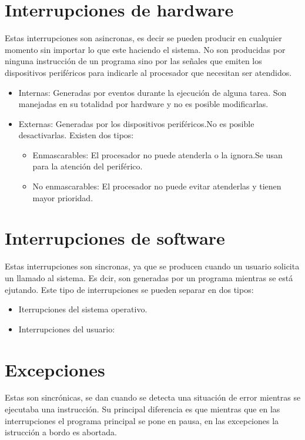\documentclass{report}   %
\begin{document}
\section*{Interrupciones de hardware}
Estas interrupciones son asincronas, es decir se pueden producir en cualquier momento sin importar lo que este haciendo el sistema. No son producidas por ninguna instrucción de un programa sino por las señales que emiten los dispositivos periféricos para indicarle al procesador que necesitan ser atendidos.

\begin{itemize}
    \item Internas: Generadas por eventos durante la ejecución de alguna tarea. Son manejadas en su totalidad por hardware y no es posible modificarlas.
    \item Externas: Generadas por los dispositivos periféricos.No es posible desactivarlas. Existen dos tipos:
      \begin{itemize}
        \item{Enmascarables:}
        El procesador no puede atenderla o la ignora.Se usan para la atención del periférico.
        \item{No enmascarables:}
        El procesador no puede evitar atenderlas y tienen mayor prioridad.
  \end{itemize}
\end{itemize}
\section*{Interrupciones de software}
Estas interrupciones son sincronas, ya que se producen cuando un usuario solicita un llamado al sistema. Es dcir, son generadas por un programa mientras se está ejutando. Este tipo de interrupciones se pueden separar en dos tipos:
\begin{itemize}
        \item{Iterrupciones del sistema operativo.}
        \item{Interrupciones del usuario:} 
  \end{itemize}
\section*{Excepciones}
Estas son sincrónicas, se dan cuando se detecta una situación de error mientras se ejecutaba una instrucción.
Su principal diferencia es que mientras que en las interrupciones el programa principal se pone en pausa, en las excepciones la istrucción a bordo es abortada.
\end{document}
